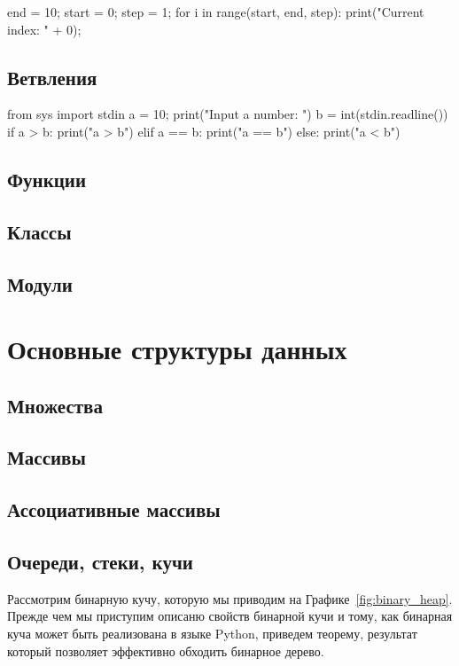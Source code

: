 \begin{python}
end = 10;
start = 0;
step = 1;
for i in range(start, end, step):
  print("Current index: " + 0);
\end{python}

\section{Ветвления}

\begin{python}
from sys import stdin
a = 10;
print("Input a number: ")
b = int(stdin.readline())
if a > b:
	print("a > b")
elif a == b:
	print("a == b")
else:
	print("a < b")
\end{python}

\section{Функции}

\section{Классы}

\section{Модули}

\chapter{Основные структуры данных}

\section{Множества}

\section{Массивы}

\section{Ассоциативные массивы}

\section{Очереди, стеки, кучи}

Рассмотрим бинарную кучу, которую мы приводим на Графике~\ref{fig:binary_heap}. Прежде чем 
мы приступим описаню свойств бинарной кучи и тому, как бинарная куча может быть реализована в 
языке Python, приведем теорему, результат который позволяет эффективно обходить бинарное дерево. 

